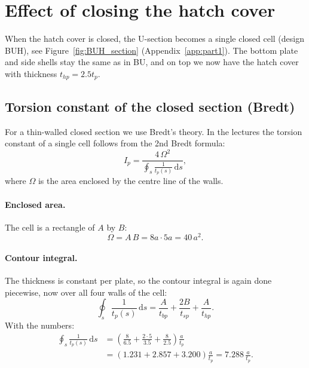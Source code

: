 
\section{Effect of closing the hatch cover}
\label{sec:a2-7}

When the hatch cover is closed, the U-section becomes a single closed cell (design BUH), see Figure~\ref{fig:BUH_section} (Appendix~\ref{app:part1}). The bottom plate and side shells stay the same as in BU, and on top we now have the hatch cover with thickness $t_{hp} = 2.5t_p$.

\subsection{Torsion constant of the closed section (Bredt)}

For a thin-walled closed section we use Bredt's theory. In the lectures the
torsion constant of a single cell follows from the 2nd Bredt formula:
\begin{equation}
  I_p = \frac{4\,\Omega^2}{\displaystyle\oint_s \frac{1}{t_p(s)}\,\mathrm{d}s} ,
  \label{eq:a27-bredt}
\end{equation}
where $\Omega$ is the area enclosed by the centre line of the walls.

\paragraph{Enclosed area.}
The cell is a rectangle of $A$ by $B$:
\begin{equation}
  \Omega = A\,B = 8a\cdot5a = 40\,a^2 .
\end{equation}

\paragraph{Contour integral.}
The thickness is constant per plate, so the contour integral is again done piecewise, now over all four walls of the cell:
\begin{equation}
  \oint_s \frac{1}{t_p(s)}\,\mathrm{d}s
  = \frac{A}{t_{bp}} + \frac{2B}{t_{sp}} + \frac{A}{t_{hp}} .
\end{equation}
With the numbers:
\begin{align}
  \oint_s \frac{1}{t_p(s)}\,\mathrm{d}s
  &= \left(\frac{8}{6.5} + \frac{2\cdot5}{3.5} + \frac{8}{2.5}\right)\frac{a}{t_p} \nonumber\\
  &= \left(1.231 + 2.857 + 3.200\right)\frac{a}{t_p} = 7.288\,\frac{a}{t_p} .
\end{align}

